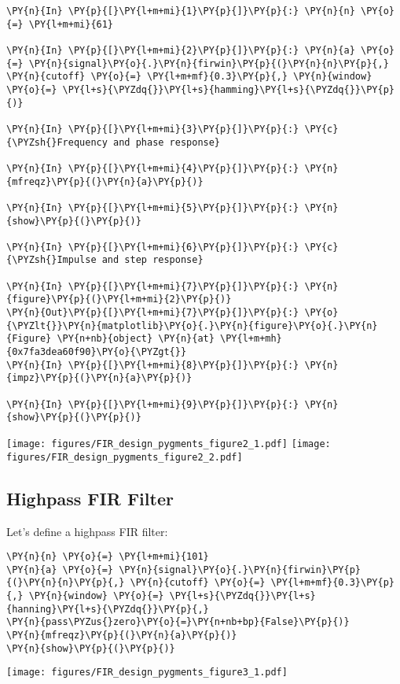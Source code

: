 \documentclass[a4paper,11pt,final]{article}
\begin{document}
\begin{Verbatim}[commandchars=\\\{\},frame=single,fontsize=\small, xleftmargin=0.5em]
\PY{n}{In} \PY{p}{[}\PY{l+m+mi}{1}\PY{p}{]}\PY{p}{:} \PY{n}{n} \PY{o}{=} \PY{l+m+mi}{61}

\PY{n}{In} \PY{p}{[}\PY{l+m+mi}{2}\PY{p}{]}\PY{p}{:} \PY{n}{a} \PY{o}{=} \PY{n}{signal}\PY{o}{.}\PY{n}{firwin}\PY{p}{(}\PY{n}{n}\PY{p}{,} \PY{n}{cutoff} \PY{o}{=} \PY{l+m+mf}{0.3}\PY{p}{,} \PY{n}{window} \PY{o}{=} \PY{l+s}{\PYZdq{}}\PY{l+s}{hamming}\PY{l+s}{\PYZdq{}}\PY{p}{)}

\PY{n}{In} \PY{p}{[}\PY{l+m+mi}{3}\PY{p}{]}\PY{p}{:} \PY{c}{\PYZsh{}Frequency and phase response}

\PY{n}{In} \PY{p}{[}\PY{l+m+mi}{4}\PY{p}{]}\PY{p}{:} \PY{n}{mfreqz}\PY{p}{(}\PY{n}{a}\PY{p}{)}

\PY{n}{In} \PY{p}{[}\PY{l+m+mi}{5}\PY{p}{]}\PY{p}{:} \PY{n}{show}\PY{p}{(}\PY{p}{)}

\PY{n}{In} \PY{p}{[}\PY{l+m+mi}{6}\PY{p}{]}\PY{p}{:} \PY{c}{\PYZsh{}Impulse and step response}

\PY{n}{In} \PY{p}{[}\PY{l+m+mi}{7}\PY{p}{]}\PY{p}{:} \PY{n}{figure}\PY{p}{(}\PY{l+m+mi}{2}\PY{p}{)}
\PY{n}{Out}\PY{p}{[}\PY{l+m+mi}{7}\PY{p}{]}\PY{p}{:} \PY{o}{\PYZlt{}}\PY{n}{matplotlib}\PY{o}{.}\PY{n}{figure}\PY{o}{.}\PY{n}{Figure} \PY{n+nb}{object} \PY{n}{at} \PY{l+m+mh}{0x7fa3dea60f90}\PY{o}{\PYZgt{}}
\PY{n}{In} \PY{p}{[}\PY{l+m+mi}{8}\PY{p}{]}\PY{p}{:} \PY{n}{impz}\PY{p}{(}\PY{n}{a}\PY{p}{)}

\PY{n}{In} \PY{p}{[}\PY{l+m+mi}{9}\PY{p}{]}\PY{p}{:} \PY{n}{show}\PY{p}{(}\PY{p}{)}
\end{Verbatim}
\texttt{[image: figures/FIR\_design\_pygments\_figure2\_1.pdf]}
\texttt{[image: figures/FIR\_design\_pygments\_figure2\_2.pdf]}


\subsection{Highpass FIR Filter}

Let's define a highpass FIR filter:


\begin{Verbatim}[commandchars=\\\{\},frame=single,fontsize=\small, xleftmargin=0.5em]
\PY{n}{n} \PY{o}{=} \PY{l+m+mi}{101}
\PY{n}{a} \PY{o}{=} \PY{n}{signal}\PY{o}{.}\PY{n}{firwin}\PY{p}{(}\PY{n}{n}\PY{p}{,} \PY{n}{cutoff} \PY{o}{=} \PY{l+m+mf}{0.3}\PY{p}{,} \PY{n}{window} \PY{o}{=} \PY{l+s}{\PYZdq{}}\PY{l+s}{hanning}\PY{l+s}{\PYZdq{}}\PY{p}{,}
\PY{n}{pass\PYZus{}zero}\PY{o}{=}\PY{n+nb+bp}{False}\PY{p}{)}
\PY{n}{mfreqz}\PY{p}{(}\PY{n}{a}\PY{p}{)}
\PY{n}{show}\PY{p}{(}\PY{p}{)}
\end{Verbatim}
\texttt{[image: figures/FIR\_design\_pygments\_figure3\_1.pdf]}
\end{document}
